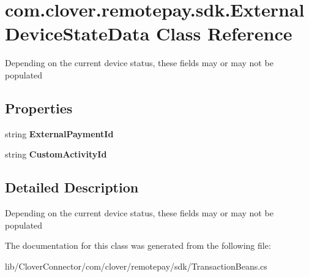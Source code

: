 \hypertarget{classcom_1_1clover_1_1remotepay_1_1sdk_1_1_external_device_state_data}{}\section{com.\+clover.\+remotepay.\+sdk.\+External\+Device\+State\+Data Class Reference}
\label{classcom_1_1clover_1_1remotepay_1_1sdk_1_1_external_device_state_data}


Depending on the current device status, these fields may or may not be populated  


\subsection*{Properties}
\begin{DoxyCompactItemize}
\item 
\mbox{\label{classcom_1_1clover_1_1remotepay_1_1sdk_1_1_external_device_state_data_ae34b82f2e85da36dec8fbe4fae2250be}} 
string {\bfseries External\+Payment\+Id}
\item 
\mbox{\label{classcom_1_1clover_1_1remotepay_1_1sdk_1_1_external_device_state_data_a8f394799ff968d17f4d908aa920019ff}} 
string {\bfseries Custom\+Activity\+Id}
\end{DoxyCompactItemize}


\subsection{Detailed Description}
Depending on the current device status, these fields may or may not be populated 



The documentation for this class was generated from the following file\+:\begin{DoxyCompactItemize}
\item 
lib/\+Clover\+Connector/com/clover/remotepay/sdk/Transaction\+Beans.\+cs\end{DoxyCompactItemize}
